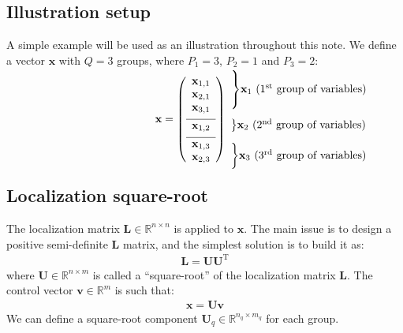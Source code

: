 \documentclass[12pt]{scrartcl}
\begin{document}
\subsection{Illustration setup}
A simple example will be used as an illustration throughout this note. We define a vector $\mathbf{x}$ with $Q = 3$ groups, where $P_1 = 3$, $P_2 = 1$ and $P_3 = 2$:
\begin{align}
\begin{array}{c@{}c}
\mathbf{x} = \left( \begin{array}{c}
\mathbf{x}_{1,1} \\
\mathbf{x}_{2,1} \\
\mathbf{x}_{3,1} \\[1ex]
\hline
\mathbf{x}_{1,2} \\[1ex]
\hline
\mathbf{x}_{1,3} \\
\mathbf{x}_{2,3}
\end{array} \right)
& 
\begin{array}{l}
\\[-8.5mm] \rdelim\}{3}{6mm}[$\mathbf{x}_1$ (1$^\text{st}$ group of variables)] \\[11.5mm] \rdelim\}{1}{6mm}[$\mathbf{x}_2$ (2$^\text{nd}$ group of variables)] \\[3.5mm] \rdelim\}{2}{6mm}[$\mathbf{x}_3$ (3$^\text{rd}$ group of variables)]
\end{array} \\[-1ex]
\end{array}
\end{align}

\subsection{Localization square-root}
The localization matrix $\mathbf{L} \in \mathbb{R}^{n \times n}$ is applied to $\mathbf{x}$. The main issue is to design a positive semi-definite $\mathbf{L}$ matrix, and the simplest solution is to build it as:
\begin{align}
\mathbf{L} = \mathbf{UU}^\textrm{T}
\end{align}
where $\mathbf{U} \in \mathbb{R}^{n \times m}$ is called a ``square-root'' of the localization matrix $\mathbf{L}$. The control vector $\mathbf{v} \in \mathbb{R}^m$ is such that:
\begin{align}
\mathbf{x} = \mathbf{U} \mathbf{v}
\end{align}
We can define a square-root component $\mathbf{U}_q \in \mathbb{R}^{n_q \times m_q}$ for each group.
\end{document}
